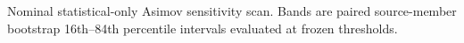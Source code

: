 Nominal statistical-only Asimov sensitivity scan. Bands are paired source-member bootstrap 16th--84th percentile intervals evaluated at frozen thresholds.
